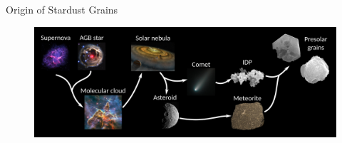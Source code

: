 \documentclass[10pt]{beamer}
\begin{document}
\begin{frame}{Origin of Stardust Grains}
    \begin{figure}
        \centering
        \includegraphics[scale = 0.2]{figs/presolar_grains_origin_1600.png}

    \end{figure}
    
    
\end{frame}
\end{document}
